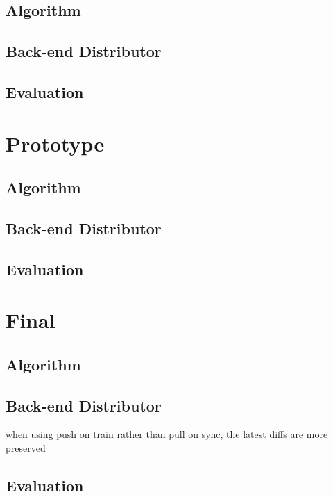 \subsection{Algorithm}
\subsection{Back-end Distributor}
\subsection{Evaluation}

\section{Prototype}
\subsection{Algorithm}
\subsection{Back-end Distributor}
\subsection{Evaluation}

\section{Final}
\subsection{Algorithm}
\subsection{Back-end Distributor}
when using push on train rather than pull on sync, the latest diffs are more preserved
\subsection{Evaluation}

